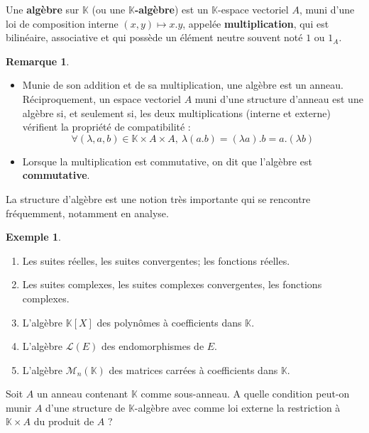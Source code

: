 \documentclass[french]{article}
\newcommand{\K}{\mathbb{K}}
\theoremstyle{plain}
\theoremstyle{definition}
\newtheorem*{ex}{Exemple}
\newtheorem*{rmq}{Remarque}
\theoremstyle{remark}
\begin{document}
\begin{dfn}
	Une \textbf{algèbre} sur $\K$ (ou une \textbf{$\K$-algèbre}) est un $\K$-espace vectoriel $A$, muni d'une loi de composition interne $(x,y)\mapsto x.y$, appelée \textbf{multiplication}, qui est bilinéaire, associative et qui possède un élément neutre souvent noté $1$ ou $1_A$.
\end{dfn}

\begin{rmq}
	\begin{itemize}
		\item Munie de son addition et de sa multiplication, une algèbre est un anneau. \\ Réciproquement, un espace vectoriel $A$ muni d'une structure d'anneau est une algèbre si, et seulement si, les deux multiplications (interne et externe) vérifient la propriété de compatibilité : $$\forall (\lambda,a,b)\in\K\times A\times A,\ \lambda(a.b)=(\lambda a).b=a.(\lambda b)$$%
		\item Lorsque la multiplication est commutative, on dit que l'algèbre est \textbf{commutative}.
	\end{itemize}
\end{rmq}

La structure d'algèbre est une notion très importante qui se rencontre fréquemment, notamment en analyse.

\begin{ex}
	\begin{enumerate}
		\item Les suites réelles, les suites convergentes; les fonctions réelles.
		\item Les suites complexes, les suites complexes convergentes, les fonctions complexes.
		\item L'algèbre $\K[X]$ des polynômes à coefficients dans $\K$.
		\item L'algèbre $\mathcal{L}(E)$ des endomorphismes de $E$.
		\item L'algèbre $\mathcal{M}_n(\K)$ des matrices carrées à coefficients dans $\K$.
	\end{enumerate}
\end{ex}

\begin{exo}
	Soit $A$ un anneau contenant $\K$ comme sous-anneau. A quelle condition peut-on munir $A$ d'une structure de $\K$-algèbre avec comme loi externe la restriction à $\K\times A$ du produit de $A$ ?
\end{exo}
\end{document}
